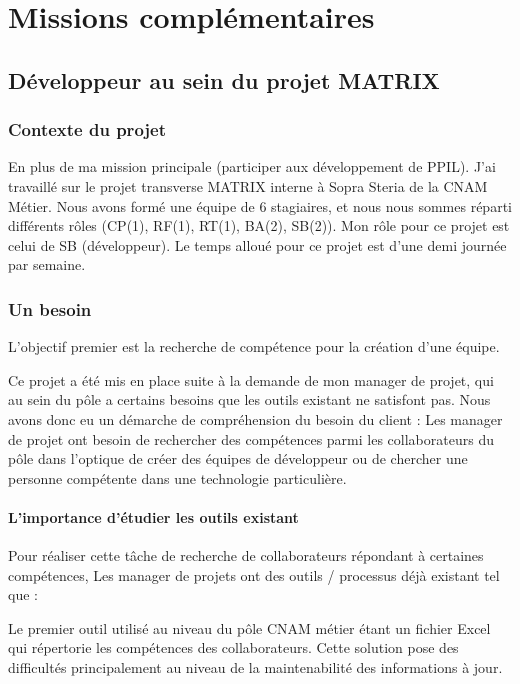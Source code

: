 \chapter{Missions complémentaires}
\label{chap:troisiemechapitre}

\section{Développeur au sein du projet MATRIX}

\subsection{Contexte du projet}

En plus de ma mission principale (participer aux développement de PPIL).
J'ai travaillé sur le projet transverse MATRIX interne à Sopra Steria de la CNAM Métier.
Nous avons formé une équipe de 6 stagiaires, et nous nous sommes réparti différents rôles (CP(1), RF(1), RT(1), BA(2), SB(2)).
Mon rôle pour ce projet est celui de SB (développeur).
Le temps alloué pour ce projet est d'une demi journée par semaine.
 
\subsection{Un besoin}

L'objectif premier est la recherche de compétence pour la création d’une équipe.

Ce projet a été mis en place suite à la demande de mon manager de projet, qui au sein du pôle a certains besoins que les outils existant ne satisfont pas. Nous avons donc eu un démarche de compréhension du besoin du client :
Les manager de projet ont besoin de rechercher des compétences parmi les collaborateurs du pôle dans l’optique de créer des équipes de développeur ou de chercher une personne compétente dans une technologie particulière.

\subsubsection{L'importance d'étudier les outils existant}

Pour réaliser cette tâche de recherche de collaborateurs répondant à certaines compétences, Les manager de projets ont des outils / processus déjà existant tel que :

Le premier outil utilisé au niveau du pôle CNAM métier étant un fichier Excel qui répertorie les compétences des collaborateurs. Cette solution pose des difficultés principalement au niveau de la maintenabilité des informations à jour.

